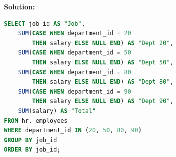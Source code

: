 \documentclass[a4paper,12pt]{article}
\begin{document}
\begin{enumerate}
    \textbf{Solution: }
    \begin{lstlisting}[language=SQL]
SELECT job_id AS "Job",
    SUM(CASE WHEN department_id = 20 
        THEN salary ELSE NULL END) AS "Dept 20",
    SUM(CASE WHEN department_id = 50 
        THEN salary ELSE NULL END) AS "Dept 50",
    SUM(CASE WHEN department_id = 80 
        THEN salary ELSE NULL END) AS "Dept 80",
    SUM(CASE WHEN department_id = 90 
        THEN salary ELSE NULL END) AS "Dept 90",
    SUM(salary) AS "Total"
FROM hr. employees
WHERE department_id IN (20, 50, 80, 90)
GROUP BY job_id
ORDER BY job_id;

    \end{lstlisting}
\end{enumerate}
\end{document}
